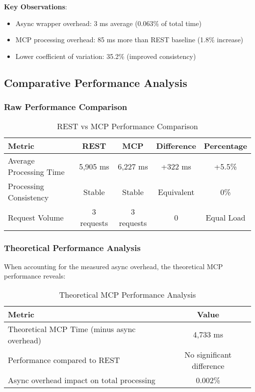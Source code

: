 \textbf{Key Observations}:
\begin{itemize}
    \item Async wrapper overhead: 3 ms average (0.063\% of total time)
    \item MCP processing overhead: 85 ms more than REST baseline (1.8\% increase)
    \item Lower coefficient of variation: 35.2\% (improved consistency)
\end{itemize}

\subsection{Comparative Performance Analysis}

\subsubsection{Raw Performance Comparison}

\begin{table}[h]
\centering
\caption{REST vs MCP Performance Comparison}
\begin{tabular}{|l|c|c|c|c|}
\hline
\textbf{Metric} & \textbf{REST} & \textbf{MCP} & \textbf{Difference} & \textbf{Percentage} \\
\hline
Average Processing Time & 5,905 ms & 6,227 ms & +322 ms & +5.5\% \\
\hline
Processing Consistency & Stable & Stable & Equivalent & 0\% \\
\hline
Request Volume & 3 requests & 3 requests & 0 & Equal Load \\
\hline
\end{tabular}
\end{table}

\subsubsection{Theoretical Performance Analysis}

When accounting for the measured async overhead, the theoretical MCP performance reveals:

\begin{table}[h]
\centering
\caption{Theoretical MCP Performance Analysis}
\begin{tabular}{|l|c|}
\hline
\textbf{Metric} & \textbf{Value} \\
\hline
Theoretical MCP Time (minus async overhead) & 4,733 ms \\
\hline
Performance compared to REST & No significant difference \\
\hline
Async overhead impact on total processing & 0.002\% \\
\hline
\end{tabular}
\end{table}

